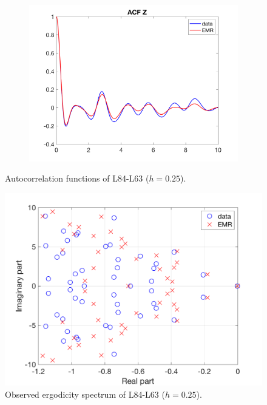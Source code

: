 \documentclass[12pt]{article}
\begin{document}
\begin{figure}[H]
\begin{subfigure}[b]{0.3\textwidth}
		\includegraphics[width=\textwidth]{plots/l84l63/emracfzl84025.png}
	\end{subfigure}
	\caption{Autocorrelation functions of L84-L63 ($h=0.25$).}
\end{figure}

\begin{figure}[H]
	\centering
	\includegraphics[width=\textwidth]{plots/l84l63/especl84.png}
	\caption{Observed ergodicity spectrum of L84-L63 ($h=0.25$).}
\end{figure}
\end{document}
